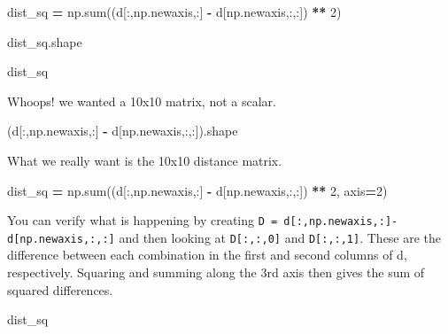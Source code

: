 \documentclass[
  letterpaper,
]{scrbook}
\newenvironment{Shaded}{\begin{snugshade}}{\end{snugshade}}
\newcommand{\BuiltInTok}[1]{#1}
\newcommand{\DecValTok}[1]{\textcolor[rgb]{0.00,0.00,0.81}{#1}}
\newcommand{\NormalTok}[1]{#1}
\newcommand{\OperatorTok}[1]{\textcolor[rgb]{0.81,0.36,0.00}{\textbf{#1}}}
\begin{document}
\begin{Shaded}
\begin{Highlighting}[]
\NormalTok{dist\_sq }\OperatorTok{=}\NormalTok{ np.}\BuiltInTok{sum}\NormalTok{((d[:,np.newaxis,:] }\OperatorTok{{-}}\NormalTok{ d[np.newaxis,:,:]) }\OperatorTok{**} \DecValTok{2}\NormalTok{)}
\end{Highlighting}
\end{Shaded}

\begin{Shaded}
\begin{Highlighting}[]
\NormalTok{dist\_sq.shape}
\end{Highlighting}
\end{Shaded}

\begin{Shaded}
\begin{Highlighting}[]
\NormalTok{dist\_sq}
\end{Highlighting}
\end{Shaded}

Whoops! we wanted a 10x10 matrix, not a scalar.

\begin{Shaded}
\begin{Highlighting}[]
\NormalTok{(d[:,np.newaxis,:] }\OperatorTok{{-}}\NormalTok{ d[np.newaxis,:,:]).shape}
\end{Highlighting}
\end{Shaded}

What we really want is the 10x10 distance matrix.

\begin{Shaded}
\begin{Highlighting}[]
\NormalTok{dist\_sq }\OperatorTok{=}\NormalTok{ np.}\BuiltInTok{sum}\NormalTok{((d[:,np.newaxis,:] }\OperatorTok{{-}}\NormalTok{ d[np.newaxis,:,:]) }\OperatorTok{**} \DecValTok{2}\NormalTok{, axis}\OperatorTok{=}\DecValTok{2}\NormalTok{)}
\end{Highlighting}
\end{Shaded}

You can verify what is happening by creating \texttt{D\ =\ d{[}:,np.newaxis,:{]}-d{[}np.newaxis,:,:{]}} and then looking at \texttt{D{[}:,:,0{]}} and \texttt{D{[}:,:,1{]}}. These are the difference between each combination in the first and second columns of d, respectively. Squaring and summing along the 3rd axis then gives the sum of squared differences.

\begin{Shaded}
\begin{Highlighting}[]
\NormalTok{dist\_sq}
\end{Highlighting}
\end{Shaded}
\end{document}
